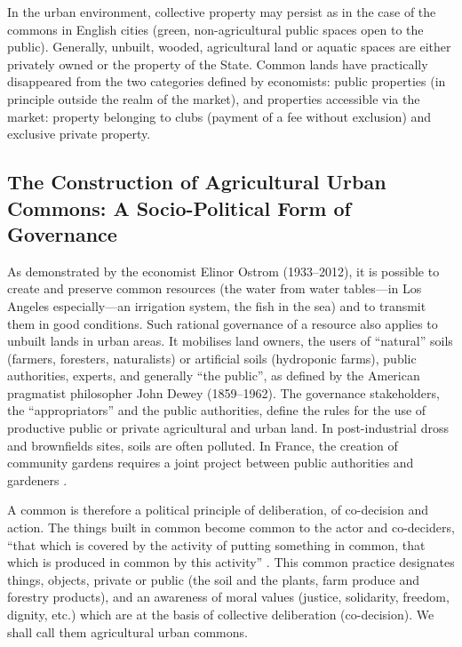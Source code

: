 \documentclass[10pt,a4paper]{article}
\begin{document}
\begin{multicols}{2}
In the urban environment, collective property may persist as in the case of the commons in English cities (green, non-agricultural public spaces open to the public). Generally, unbuilt, wooded, agricultural land or aquatic spaces are either privately owned or the property of the State. Common lands have practically disappeared from the two categories defined by economists: public properties (in principle outside the realm of the market), and properties accessible via the market: property belonging to clubs (payment of a fee without exclusion) and exclusive private property.

\subsection{The Construction of Agricultural Urban Commons: A Socio-Political Form of Governance}
\noindent As demonstrated by the economist Elinor Ostrom (1933--2012), it is possible to create and preserve common resources (the water from water tables---in Los Angeles especially---an irrigation system, the fish in the sea) and to transmit them in good conditions. Such rational governance of a resource also applies to unbuilt lands in urban areas. It mobilises land owners, the users of ``natural'' soils (farmers, foresters, naturalists) or artificial soils (hydroponic farms), public authorities, experts, and generally ``the public'', as defined by the American pragmatist philosopher John Dewey (1859--1962). The governance stakeholders, the ``appropriators'' and the public authorities, define the rules for the use of productive public or private agricultural and urban land. In post-industrial dross and brownfields sites, soils are often polluted. In France, the creation of community gardens requires a joint project between public authorities and gardeners \citep{r05}.

A common is therefore a political principle of deliberation, of co-decision and action. The things built in common become common to the actor and co-deciders, ``that which is covered by the activity of putting something in common, that which is produced in common by this activity'' \citep{r01}. This common practice designates things, objects, private or public (the soil and the plants, farm produce and forestry products), and an awareness of moral values (justice, solidarity, freedom, dignity, etc.) which are at the basis of collective deliberation (co-decision). We shall call them agricultural urban commons.



\end{multicols}
\end{document}
